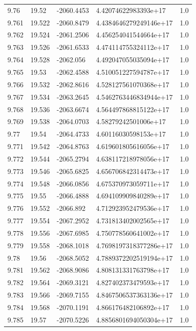 \begin{tabular}{lllll}
9.76 & 19.52 & -2060.4453 & 4.42074622983393e+17 & 1.0 \\
9.761 & 19.522 & -2060.8479 & 4.4384646279249146e+17 & 1.0 \\
9.762 & 19.524 & -2061.2506 & 4.456254041544664e+17 & 1.0 \\
9.763 & 19.526 & -2061.6533 & 4.474114755324112e+17 & 1.0 \\
9.764 & 19.528 & -2062.056 & 4.492047055035094e+17 & 1.0 \\
9.765 & 19.53 & -2062.4588 & 4.510051227594787e+17 & 1.0 \\
9.766 & 19.532 & -2062.8616 & 4.528127561070368e+17 & 1.0 \\
9.767 & 19.534 & -2063.2645 & 4.5462763446834944e+17 & 1.0 \\
9.768 & 19.536 & -2063.6674 & 4.564497868815122e+17 & 1.0 \\
9.769 & 19.538 & -2064.0703 & 4.58279242501006e+17 & 1.0 \\
9.77 & 19.54 & -2064.4733 & 4.60116030598153e+17 & 1.0 \\
9.771 & 19.542 & -2064.8763 & 4.619601805616056e+17 & 1.0 \\
9.772 & 19.544 & -2065.2794 & 4.638117218978056e+17 & 1.0 \\
9.773 & 19.546 & -2065.6825 & 4.656706842314473e+17 & 1.0 \\
9.774 & 19.548 & -2066.0856 & 4.675370973059711e+17 & 1.0 \\
9.775 & 19.55 & -2066.4888 & 4.694109909840289e+17 & 1.0 \\
9.776 & 19.552 & -2066.892 & 4.712923952479536e+17 & 1.0 \\
9.777 & 19.554 & -2067.2952 & 4.731813402002565e+17 & 1.0 \\
9.778 & 19.556 & -2067.6985 & 4.750778560641002e+17 & 1.0 \\
9.779 & 19.558 & -2068.1018 & 4.7698197318377286e+17 & 1.0 \\
9.78 & 19.56 & -2068.5052 & 4.7889372202519194e+17 & 1.0 \\
9.781 & 19.562 & -2068.9086 & 4.808131331763798e+17 & 1.0 \\
9.782 & 19.564 & -2069.3121 & 4.827402373479593e+17 & 1.0 \\
9.783 & 19.566 & -2069.7155 & 4.8467506537363136e+17 & 1.0 \\
9.784 & 19.568 & -2070.1191 & 4.866176482106892e+17 & 1.0 \\
9.785 & 19.57 & -2070.5226 & 4.8856801694050304e+17 & 1.0 \\

\end{tabular}
